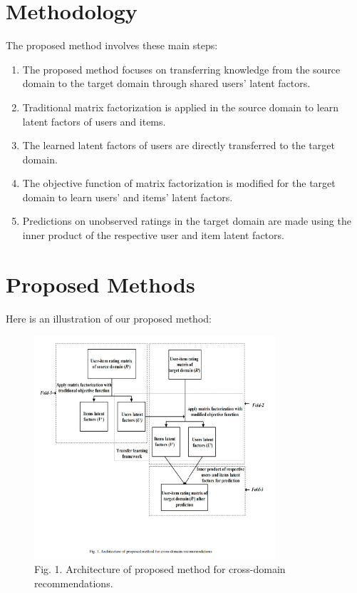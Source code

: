 \documentclass{article}
\begin{document}
\section{Methodology}
The proposed method involves these main steps:
\begin{enumerate}
  \item The proposed method focuses on transferring knowledge from the source domain to the target domain through shared users' latent factors.
  \item Traditional matrix factorization is applied in the source domain to learn latent factors of users and items.
  \item The learned latent factors of users are directly transferred to the target domain.
  \item The objective function of matrix factorization is modified for the target domain to learn users' and items' latent factors.
  \item Predictions on unobserved ratings in the target domain are made using the inner product of the respective user and item latent factors.
\end{enumerate}

\section{Proposed Methods}

Here is an illustration of our proposed method:

\begin{figure}[h]
  \centering
  \includegraphics[width=0.8\textwidth]{mf.PNG}
  \caption{Fig. 1. Architecture of proposed method for cross-domain recommendations.}
  \label{fig:proposed_method}
\end{figure}
\end{document}

